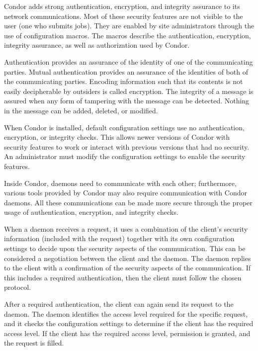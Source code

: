 Condor adds strong authentication, encryption, and integrity
assurance to its network communications.
Most of these security features are not visible to the user
(one who submits jobs).
They are enabled by site administrators through the use of
configuration macros.
The macros describe the authentication, encryption,
integrity assurance, as well as authorization used by Condor.

Authentication provides an assurance of the identity of one of the
communicating parties.
Mutual authentication provides an assurance of the identities of
both of the communicating parties.
Encoding information such that its contents is not easily
decipherable by outsiders is called encryption.
The integrity of a message is assured when any form of
tampering with the message can be detected. 
Nothing in the message can be added, deleted, or modified.

When Condor is installed, default configuration settings
use no authentication, encryption, or integrity checks.
This allows newer versions of Condor with
security features to work or interact
with previous versions that had no security.
An administrator must modify the configuration settings to
enable the security features.

Inside Condor, daemons need to communicate with each other;
furthermore, various tools provided by Condor may also
require communication with Condor daemons.
All these communications can be made more secure
through the proper usage of authentication, encryption,
and integrity checks.

When a daemon receives a request,
it uses a combination of the client's security information
(included with the request)
together with its own configuration settings to decide upon
the security aspects of the communication.
This can be considered a negotiation between the client and
the daemon.
The daemon replies to the client with a confirmation of
the security aspects of the communication.
If this includes a required authentication, then the
client must follow the chosen protocol.

After a required authentication, the client can again send its
request to the daemon. 
The daemon identifies the access level required for the specific
request,
and it checks the configuration settings to determine if the client 
has the required access level.
If the client has the required access level,
permission is granted, and the request is filled. 

